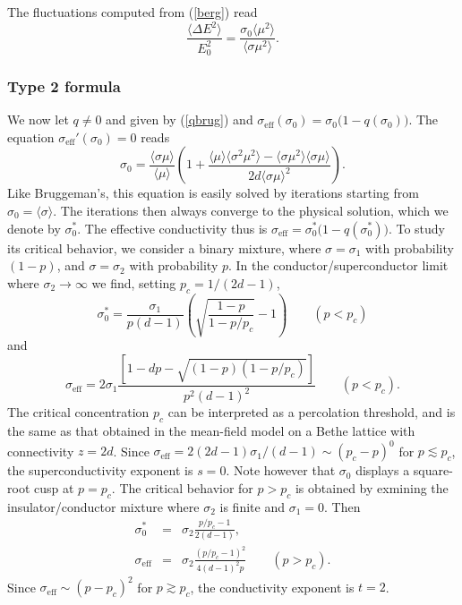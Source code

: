 The fluctuations computed from (\ref{berg}) read
\begin{equation}
\frac{\langle\Delta E^2\rangle}{E_0^2}=
\frac{\sigma_0\langle\mu^2\rangle}
{\langle\sigma\mu^2\rangle}.
\end{equation}

\subsubsection{Type 2 formula}
We now let $q\neq 0$ and given by (\ref{qbrug}) and
$\sigma_{\text{eff}}(\sigma_0)=\sigma_0\bigl(1-q(\sigma_0)\bigr)$. The
equation $\sigma_{\text{eff}}'(\sigma_0)=0$ reads
\begin{equation}
\label{eqsigo}
\sigma_0=\frac{\langle\sigma\mu\rangle}{\langle\mu\rangle}
\left(1+\frac{\langle\mu\rangle\langle\sigma^2\mu^2\rangle
-\langle\sigma\mu^2\rangle\langle\sigma\mu\rangle}
{2d\langle\sigma\mu\rangle^2}\right).
\end{equation}
Like Bruggeman's, this equation is easily solved by iterations starting
from $\sigma_0=\langle\sigma\rangle$. The iterations then always
converge to the physical solution, which we denote by
$\sigma_0^*$. The effective conductivity thus is
$\sigma_{\text{eff}}=\sigma_0^*\bigl(1-q(\sigma_0^*)\bigr)$.  To study
its critical behavior, we consider a binary mixture, where
$\sigma=\sigma_1$ with probability $(1-p)$, and $\sigma=\sigma_2$ with
probability $p$. In the conductor/superconductor limit where
$\sigma_2\to\infty$ we find, setting $p_c=1/(2d-1)$,
\begin{equation}
\label{sols0}
\sigma_0^*=\frac{\sigma_1}{p(d-1)}\left(\sqrt{\frac{1-p}{1-p/p_c}}
-1\right)\qquad (p<p_c)
\end{equation}
and
\begin{equation}
\label{solseff}
\sigma_{\text{eff}}=2\sigma_1\frac{\left[1-dp
-\sqrt{(1-p)(1-p/p_c)}\right]}{p^2(d-1)^2}\qquad  (p<p_c).
\end{equation}
The critical concentration $p_c$ can be interpreted as a percolation
threshold, and is the same as that obtained in the mean-field model on
a Bethe lattice\cite{STEP77} with connectivity $z=2d$. Since
$\sigma_{\text{eff}}=2(2d-1)\sigma_1/(d-1)\sim(p_c-p)^0$ for
$p\lesssim p_c$, the superconductivity exponent is $s=0$. Note however
that $\sigma_0$ displays a square-root cusp at $p=p_c$.  The critical
behavior for $p>p_c$ is obtained by exmining the insulator/conductor
mixture where $\sigma_2$ is finite and $\sigma_1=0$.  Then
\begin{eqnarray}
\sigma_0^*&=&\sigma_2\frac{p/p_c-1}{2(d-1)},\\
\sigma_{\text{eff}}&=&\sigma_2\frac{(p/p_c-1)^2}{4(d-1)^2 p} 
\qquad  (p>p_c).
\end{eqnarray}
Since $\sigma_{\text{eff}}\sim(p-p_c)^2$ for $p\gtrsim p_c$, 
the conductivity exponent is $t=2$.

